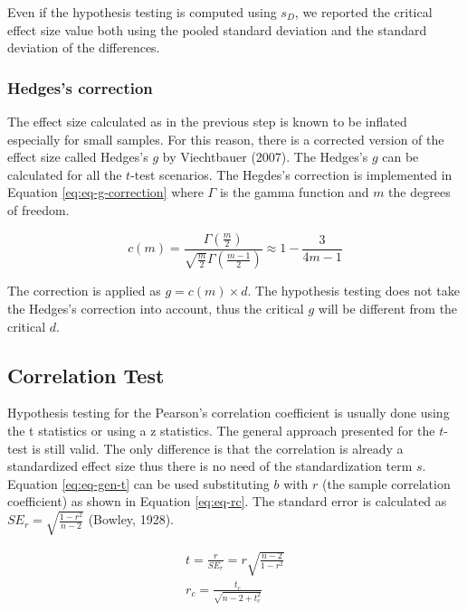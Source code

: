 \documentclass[
  man,floatsintext]{apa7}
\begin{document}
Even if the hypothesis testing is computed using \(s_D\), we reported the critical effect size value both using the pooled standard deviation and the standard deviation of the differences.

\hypertarget{hedgess-correction}{%
\subsubsection{Hedges's correction}\label{hedgess-correction}}

The effect size calculated as in the previous step is known to be inflated especially for small samples. For this reason, there is a corrected version of the effect size called Hedges's \(g\) by Viechtbauer (2007). The Hedges's \(g\) can be calculated for all the \(t\)-test scenarios. The Hegdes's correction is implemented in Equation \eqref{eq:eq-g-correction} where \(\Gamma\) is the gamma function and \(m\) the degrees of freedom.

\begin{equation}
\label{eq:eq-g-correction}
c(m) = \frac{\Gamma\left(\frac{m}{2}\right)}{\sqrt{\frac{m}{2}} \Gamma\left(\frac{m-1}{2}\right)} \approx 1 - \frac{3}{4m - 1}
\end{equation}

The correction is applied as \(g = c(m) \times d\). The hypothesis testing does not take the Hedges's correction into account, thus the critical \(g\) will be different from the critical \(d\).

\hypertarget{correlation-test}{%
\subsection{Correlation Test}\label{correlation-test}}

Hypothesis testing for the Pearson's correlation coefficient is usually done using the t statistics or using a z statistics. The general approach presented for the \(t\)-test is still valid. The only difference is that the correlation is already a standardized effect size thus there is no need of the standardization term \(s\). Equation \eqref{eq:eq-gen-t} can be used substituting \(b\) with \(r\) (the sample correlation coefficient) as shown in Equation \eqref{eq:eq-rc}. The standard error is calculated as \(SE_r = \sqrt{\frac{1 - r^2}{n - 2}}\) (Bowley, 1928).

\begin{equation}
\label{eq:eq-rc}
    \begin{gathered}
        t = \frac{r}{SE_r} = r \sqrt{\frac{n - 2}{1 - r^2}} \\
        r_c = \frac{t_c}{\sqrt{n - 2 + t_c^2}}
    \end{gathered}
\end{equation}
\end{document}
